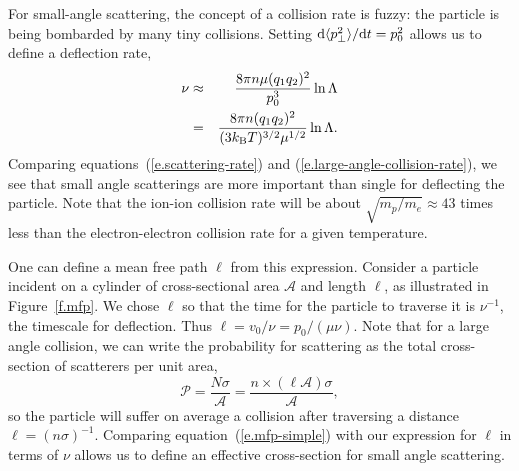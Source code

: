For small-angle scattering, the concept of a collision rate is fuzzy: the particle is being bombarded by many tiny collisions.  Setting $\mathrm{d} \langle p_{\bot}^{2}\rangle/\mathrm{d} t = p_{0}^{2}$ allows us to define a deflection rate,
\begin{eqnarray}\label{e.scattering-rate}
\nu &\approx& \frac{8\pi n \mu (q_{1}q_{2})^{2}}{p_{0}^{3}} \ln\Lambda\\
 &=& \frac{8\pi n (q_{1}q_{2})^{2}}{(3k_\mathrm{B} T)^{3/2}\mu^{1/2}}\ln\Lambda.
\end{eqnarray}
Comparing equations~(\ref{e.scattering-rate}) and (\ref{e.large-angle-collision-rate}), we see that small angle scatterings are more important than single for deflecting the particle. Note that the ion-ion collision rate will be about $\sqrt{m_{p}/m_{e}} \approx 43$ times less than the electron-electron collision rate for a given temperature.

One can define a mean free path $\ell$ from this expression. Consider a particle incident on a cylinder of cross-sectional area $\mathcal{A}$ and length $\ell$, as illustrated in Figure~\ref{f.mfp}. We chose $\ell$ so that the time for the particle to traverse it is $\nu^{-1}$, the timescale for deflection.  Thus $\ell = v_{0}/\nu = p_{0}/(\mu\nu)$. Note that for a large angle collision, we can write the probability for scattering as the total cross-section of scatterers per unit area,
\begin{equation}\label{e.mfp-simple}
\mathcal{P} = \frac{N\sigma}{\mathcal{A}} = \frac{n\times(\ell\mathcal{A})\sigma}{\mathcal{A}},
\end{equation}
so the particle will suffer on average a collision after traversing a distance $\ell = (n\sigma)^{-1}$. Comparing equation~(\ref{e.mfp-simple}) with our expression for $\ell$ in terms of $\nu$ allows us to define an effective cross-section for small angle scattering.

